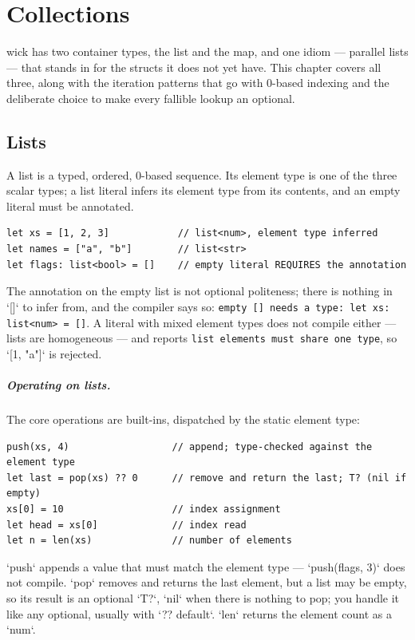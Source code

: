 \chapter{Collections}

wick has two container types, the list and the map, and one idiom --- parallel
lists --- that stands in for the structs it does not yet have. This chapter
covers all three, along with the iteration patterns that go with 0-based
indexing and the deliberate choice to make every fallible lookup an optional.

\section{Lists}

A list is a typed, ordered, 0-based sequence. Its element type is one of the
three scalar types; a list literal infers its element type from its contents,
and an empty literal must be annotated.

\begin{lstlisting}[language=wick]
let xs = [1, 2, 3]            // list<num>, element type inferred
let names = ["a", "b"]        // list<str>
let flags: list<bool> = []    // empty literal REQUIRES the annotation
\end{lstlisting}

\noindent
The annotation on the empty list is not optional politeness; there is nothing
in `[]` to infer from, and the compiler says so:
\texttt{empty [] needs a type: let xs: list<num> = []}. A literal with mixed
element types does not compile either --- lists are homogeneous ---
and reports \texttt{list elements must share one type}, so `[1, "a"]` is
rejected.

\paragraph{Operating on lists.} The core operations are built-ins, dispatched
by the static element type:

\begin{lstlisting}[language=wick]
push(xs, 4)                  // append; type-checked against the element type
let last = pop(xs) ?? 0      // remove and return the last; T? (nil if empty)
xs[0] = 10                   // index assignment
let head = xs[0]             // index read
let n = len(xs)              // number of elements
\end{lstlisting}

\noindent
`push` appends a value that must match the element type --- `push(flags, 3)`
does not compile. `pop` removes and returns the last element, but a list may
be empty, so its result is an optional `T?`, `nil` when there is nothing to
pop; you handle it like any optional, usually with `?? default`. `len` returns
the element count as a `num`.

